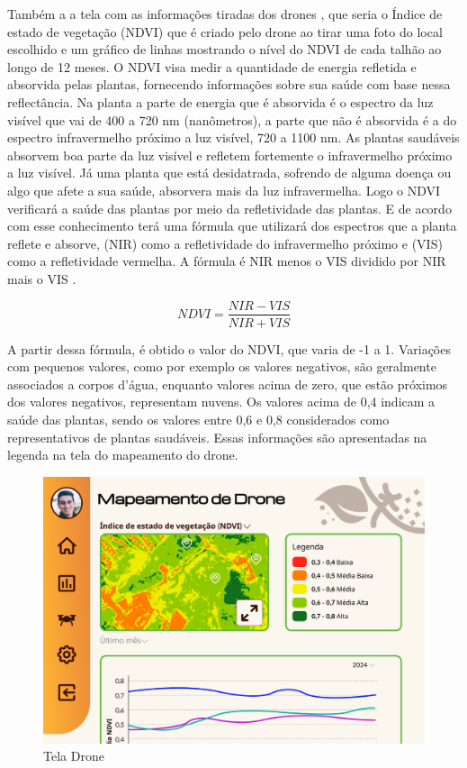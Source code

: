 \documentclass[
    a4paper,%
    12pt,%
    english,%
    brazilian,%
]{article}
\begin{document}
Também a a tela com as informações tiradas dos drones , que seria o Índice de  estado de vegetação (NDVI) que é criado pelo drone ao tirar uma foto do local escolhido e um gráfico de linhas mostrando o nível do NDVI de cada talhão ao longo de 12 meses. O NDVI visa medir a quantidade de energia refletida e absorvida pelas plantas, fornecendo informações sobre sua saúde com base nessa reflectância. Na planta a parte de energia que é absorvida é o espectro da luz visível que vai de 400 a 720 nm (nanômetros), a parte que não é absorvida é a do espectro infravermelho próximo a luz visível, 720 a 1100 nm. As plantas saudáveis absorvem boa parte da luz visível e refletem fortemente o infravermelho próximo a luz visível. Já uma planta que está desidatrada, sofrendo de alguma doença ou algo que afete a sua saúde, absorvera mais da luz infravermelha. Logo o NDVI verificará a saúde das plantas por meio da refletividade das plantas. E de acordo com esse conhecimento terá uma fórmula que utilizará dos espectros que a planta reflete e absorve, (NIR) como a refletividade do infravermelho próximo e (VIS) como a refletividade vermelha. A fórmula é NIR menos o VIS dividido por NIR mais o VIS \cite{ResultadoNDVIArtigo, ResultadoNDVISite}.  

\[ NDVI =  \frac{NIR - VIS}{NIR + VIS} \]

A partir dessa fórmula, é obtido o valor do NDVI, que varia de -1 a 1. Variações com pequenos valores, como por exemplo os valores negativos, são geralmente associados a corpos d'água, enquanto valores acima de zero, que estão próximos dos valores negativos, representam nuvens. Os valores acima de 0,4 indicam a saúde das plantas, sendo os valores entre 0,6 e 0,8 considerados como representativos de plantas saudáveis. Essas informações são apresentadas na legenda na tela do mapeamento do drone.

\begin{figure}[H]
\centering
\caption{Tela Drone}%
\label{fig:tela-drone}
\includegraphics[width=0.8\linewidth]{Logos/tela-drone.png}
\end{figure}
\end{document}
